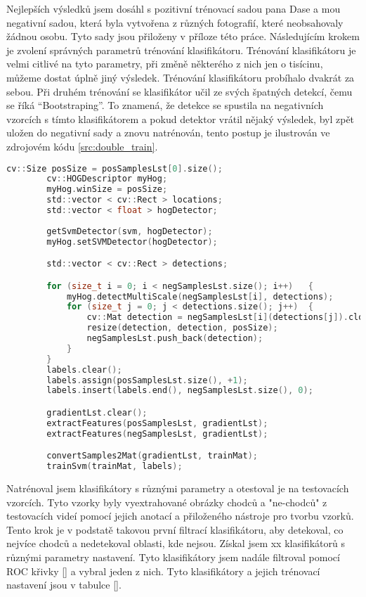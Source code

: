 Nejlepších výsledků jsem dosáhl s pozitivní trénovací sadou pana Dase \cite{sudipDas} a mou negativní sadou, která byla vytvořena z různých fotografií, které neobsahovaly žádnou osobu. Tyto sady jsou přiloženy v příloze této práce. Následujícím krokem je zvolení správných parametrů trénování klasifikátoru. Trénování klasifikátoru je velmi citlivé na tyto parametry, při změně některého z nich jen o tisícinu, můžeme dostat úplně jiný výsledek. Trénování klasifikátoru probíhalo dvakrát za sebou. Při druhém trénování se klasifikátor učil ze svých špatných detekcí, čemu se říká ``Bootstraping''. To znamená, že detekce se spustila na negativních vzorcích s tímto klasifikátorem a pokud detektor vrátil nějaký výsledek, byl zpět uložen do negativní sady a znovu natrénován, tento postup je ilustrován ve zdrojovém kódu \ref{src:double_train}.
\newpage
\begin{lstlisting}[label=src:double_train, language=c, caption=Bootstraping]
		cv::Size posSize = posSamplesLst[0].size();
		cv::HOGDescriptor myHog;
		myHog.winSize = posSize;
		std::vector < cv::Rect > locations;
		std::vector < float > hogDetector;
		
		getSvmDetector(svm, hogDetector);
		myHog.setSVMDetector(hogDetector);

		std::vector < cv::Rect > detections;

		for (size_t i = 0; i < negSamplesLst.size(); i++)	{
			myHog.detectMultiScale(negSamplesLst[i], detections);
			for (size_t j = 0; j < detections.size(); j++)	{
				cv::Mat detection = negSamplesLst[i](detections[j]).clone();
				resize(detection, detection, posSize);
				negSamplesLst.push_back(detection);
			}
		}
		labels.clear();
		labels.assign(posSamplesLst.size(), +1);
		labels.insert(labels.end(), negSamplesLst.size(), 0);

		gradientLst.clear();
		extractFeatures(posSamplesLst, gradientLst);
		extractFeatures(negSamplesLst, gradientLst);

		convertSamples2Mat(gradientLst, trainMat);
		trainSvm(trainMat, labels);
\end{lstlisting}

Natrénoval jsem klasifikátory s různými parametry a otestoval je na testovacích vzorcích. Tyto vzorky byly vyextrahované obrázky chodců a "ne-chodců" z testovacích videí pomocí jejich anotací a přiloženého nástroje pro tvorbu vzorků. Tento krok je v podstatě takovou první filtrací klasifikátoru, aby detekoval, co nejvíce chodců a nedetekoval oblasti, kde nejsou. Získal jsem xx klasifikátorů s různými parametry nastavení. Tyto klasifikátory jsem nadále filtroval pomocí ROC křivky \ref{} a vybral jeden z nich. Tyto klasifikátory a jejich trénovací nastavení jsou v tabulce \ref{}. 

